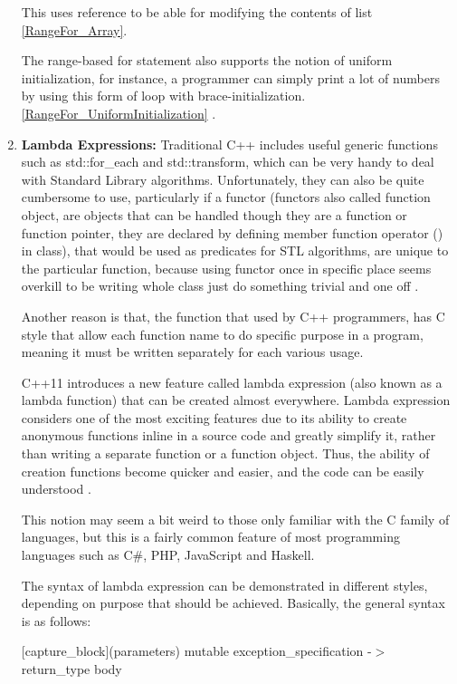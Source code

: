 \documentclass[11pt]{report}
\begin{document}
\begin{enumerate}
This uses reference to be able for modifying the contents of list \ref{RangeFor_Array}.
\newline

The range-based for statement also supports the notion of uniform initialization, for instance, a programmer can simply print a lot of numbers by using this form of loop with brace-initialization. \ref{RangeFor_UniformInitialization} \cite{Overland:2011:CWF}.

\item \textbf{Lambda Expressions:} Traditional C++ includes useful generic functions such as std::for\_each and std::transform, which can be very handy to deal with Standard Library algorithms.  Unfortunately, they can also be quite cumbersome to use, particularly if a functor (functors also called function object, are objects that can be handled though they are a function or function pointer, they are declared by defining member function operator () in class), that would be used as predicates for STL algorithms, are unique to the particular function, because using functor once in specific place seems overkill to be writing whole class just do something trivial and one off \cite{Allain:2011:FutureCpp}. 
\newline

Another reason is that, the function that used by C++ programmers, has C style that  allow each function name to do specific purpose in a program, meaning it must be written separately for each various usage.
\newline

C++11 introduces a new feature called lambda expression (also known as a lambda function) that can be created almost everywhere. Lambda expression considers one of the most exciting features due to its ability to create anonymous functions inline in a source code and greatly simplify it, rather than writing a separate function or a function object.  Thus, the ability of creation functions become quicker and easier, and the code can be easily understood \cite{Gregorie:professionalcpp}.
\newline

This notion may seem a bit weird to those only familiar with the C family of languages, but this is a fairly common feature of most programming languages such as C\#, PHP, JavaScript and Haskell.  
\newline

The syntax of lambda expression can be demonstrated in different styles, depending on purpose that should be achieved. Basically, the general syntax is as follows:
\begin{center}
[capture\_block](parameters) mutable exception\_specification -$>$ return\_type {body}
\end{center}


\end{enumerate}
\end{document}
